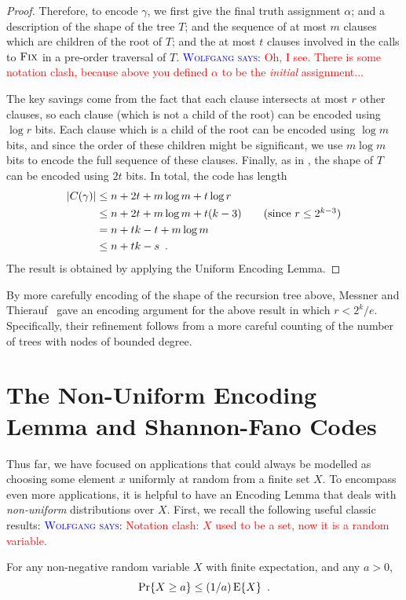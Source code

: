 \documentclass{patmorin}
\newcommand{\aremark}[3]{\textcolor{blue}{\textsc{#1 #2:}}
  \textcolor{red}{\textsf{#3}}}
\newcommand{\wolfgang}[2][says]{\aremark{Wolfgang}{#1}{#2}}
\begin{document}
\begin{proof}
  Therefore, to encode $\gamma$, we first give the final truth
  assignment $\alpha$; and a description of the shape of the tree $T$;
  and the sequence of at most $m$ clauses which are children of the
  root of $T$; and the at most $t$ clauses involved in the calls to
  $\textsc{Fix}$ in a pre-order traversal of $T$.
  \wolfgang{Oh, I see. There is some notation clash, because above
  you defined $\alpha$ to be the \emph{initial} assignment...}

  The key savings come from the fact that each clause intersects at
  most $r$ other clauses, so each clause (which is not a child of the
  root) can be encoded using $\log r$ bits. Each clause which is a
  child of the root can be encoded using $\log m$ bits, and since the
  order of these children might be significant, we use $m \log m$ bits
  to encode the full sequence of these clauses. Finally, as in
  , the shape of $T$ can be encoded
  using $2t$ bits. In total, the code has length
  \begin{align*}
    |C(\gamma)| &\le n + 2t + m\log m+ t \log r \\
    &\le n + 2t + m\log m + t(k - 3) \tag{since $r \le 2^{k - 3}$} \\
    &= n + tk - t + m\log m \\
    &\le n + tk - s \enspace .
  \end{align*}
  The result is obtained by applying the Uniform Encoding Lemma.
\end{proof}

\begin{rem}
  By more carefully encoding of the shape of the recursion tree above,
  Messner and Thierauf~\cite{messner:ksat} gave an encoding argument
  for the above result in which $r < 2^k/e$. Specifically, their 
  refinement follows
  from a more careful counting of the number of trees with nodes of
  bounded degree.
\end{rem}

\section{The Non-Uniform Encoding Lemma and Shannon-Fano Codes}

Thus far, we have focused on applications that could always
be modelled as choosing some element $x$ uniformly at random from a
finite set $X$. To encompass even more applications, it is helpful 
to have an
Encoding Lemma that deals with \emph{non-uniform} distributions over
$X$. First, we recall the following useful classic results:
\wolfgang{Notation clash: $X$ used to be a set, now it is a random
variable.}
\begin{thm}
  For any non-negative random variable $X$ with finite expectation,
  and any $a > 0$,
  \[
    \Pr\{X \geq a\} \leq (1/a) \operatorname{\mathrm{E}}\{X\} \enspace .
  \]
\end{thm}
\end{document}
